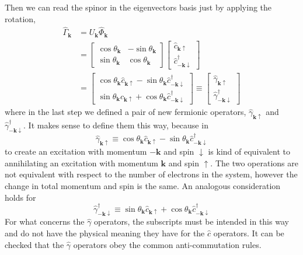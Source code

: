 Then we can read the spinor in the eigenvectors basis just by applying the rotation,
\[
\begin{aligned}
	\hat{\Gamma}_\mathbf{k} &= U_\mathbf{k} \hat{\Phi}_\mathbf{k} \\
	&= \begin{bmatrix}
		  \cos \theta_\mathbf{k} & - \sin \theta_\mathbf{k} \\
		  \sin \theta_\mathbf{k} & \cos \theta_\mathbf{k}
	\end{bmatrix} \begin{bmatrix}
		\hat{c}_{\mathbf{k}\uparrow} \\
		\hat{c}_{-\mathbf{k}\downarrow}^\dagger
	\end{bmatrix} \\
	&= \begin{bmatrix}
		\cos \theta_\mathbf{k} \hat{c}_{\mathbf{k}\uparrow} - \sin \theta_\mathbf{k} \hat{c}_{-\mathbf{k}\downarrow}^\dagger \\
		\sin \theta_\mathbf{k} \hat{c}_{\mathbf{k}\uparrow} + \cos \theta_\mathbf{k} \hat{c}_{-\mathbf{k}\downarrow}^\dagger
	\end{bmatrix} \equiv \begin{bmatrix}
		\hat{\gamma}_{\mathbf{k}\uparrow} \\
		\hat{\gamma}_{-\mathbf{k}\downarrow}^\dagger
	\end{bmatrix}
\end{aligned}
\]
where in the last step we defined a pair of new fermionic operators, $\hat{\gamma}_{\mathbf{k}\uparrow}$ and $\hat{\gamma}_{-\mathbf{k}\downarrow}^\dagger$. It makes sense to define them this way, because in
\[
	\hat{\gamma}_{\mathbf{k}\uparrow} \equiv \cos \theta_\mathbf{k} \hat{c}_{\mathbf{k}\uparrow} - \sin \theta_\mathbf{k} \hat{c}_{-\mathbf{k}\downarrow}^\dagger
\]
to create an excitation with momentum $-\mathbf{k}$ and spin $\downarrow$ is kind of equivalent to annihilating an excitation with momentum $\mathbf{k}$ and spin $\uparrow$. The two operations are not equivalent with respect to the number of electrons in the system, however the change in total momentum and spin is the same. An analogous consideration holds for
\[
	\hat{\gamma}_{-\mathbf{k}\downarrow}^\dagger \equiv \sin \theta_\mathbf{k} \hat{c}_{\mathbf{k}\uparrow} + \cos \theta_\mathbf{k} \hat{c}_{-\mathbf{k}\downarrow}^\dagger
\]
For what concerns the $\hat{\gamma}$ operators, the subscripts must be intended in this way and do not have the physical meaning they have for the $\hat{c}$ operators. It can be checked that the $\hat{\gamma}$ operators obey the common anti-commutation rules.
